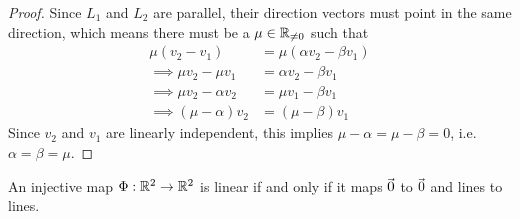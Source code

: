 \begin{proof}
	Since $L_1$ and $L_2$ are parallel, their direction vectors must point in the same direction, which means there must be a $\mu \in \mathbb{R}_{\neq 0}$ such that
	\begin{align*}
		\mu(v_2 - v_1) &= \mu(\alpha v_2 - \beta v_1)\\
		\implies \mu v_2 - \mu v_1 &= \alpha v_2 - \beta v_1\\
		\implies \mu v_2 - \alpha v_2 &= \mu v_1 - \beta v_1\\
		\implies (\mu - \alpha) v_2 &= (\mu - \beta) v_1
	\end{align*}
	Since $v_2$ and $v_1$ are linearly independent, this implies $\mu- \alpha = \mu - \beta = 0$, i.e. $\alpha = \beta = \mu$.
\end{proof}
\begin{theorem}
	An injective map $\Phi : \mathbb{R}^2 \to \mathbb{R}^2$ is linear if and only if it maps $\kern-1.2pt\vec{\kern1.2pt 0}$ to $\kern-1.2pt\vec{\kern1.2pt 0}$ and lines to lines.
\end{theorem}

